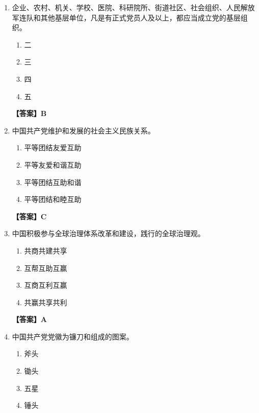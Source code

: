 \documentclass[UTF8,11pt,a4paper]{ctexart}
\begin{document}
\begin{enumerate}[label=\textbf{\arabic*.}, leftmargin=2.5em, itemsep=0.7em]
\begin{enumerate}[label=\Alph*., leftmargin=2em, itemsep=0.1em, topsep=0.15em]
\item 政治标准
\item 思想标准
\item 道德标准
\item 行为标准
\end{enumerate}
\textbf{【答案】A}
\item 企业、农村、机关、学校、医院、科研院所、街道社区、社会组织、人民解放军连队和其他基层单位，凡是有正式党员\allowbreak\underline{\hspace{4em}}人及以上，都应当成立党的基层组织。
\begin{enumerate}[label=\Alph*., leftmargin=2em, itemsep=0.1em, topsep=0.15em]
\item 二
\item 三
\item 四
\item 五
\end{enumerate}
\textbf{【答案】B}
\item 中国共产党维护和发展\allowbreak\underline{\hspace{4em}}的社会主义民族关系。
\begin{enumerate}[label=\Alph*., leftmargin=2em, itemsep=0.1em, topsep=0.15em]
\item 平等团结友爱互助
\item 平等友爱和谐互助
\item 平等团结互助和谐
\item 平等团结和睦互助
\end{enumerate}
\textbf{【答案】C}
\item 中国积极参与全球治理体系改革和建设，践行\allowbreak\underline{\hspace{4em}}的全球治理观。
\begin{enumerate}[label=\Alph*., leftmargin=2em, itemsep=0.1em, topsep=0.15em]
\item 共商共建共享
\item 互帮互助互赢
\item 互商互利互赢
\item 共赢共享共利
\end{enumerate}
\textbf{【答案】A}
\item 中国共产党党徽为镰刀和\allowbreak\underline{\hspace{4em}}组成的图案。
\begin{enumerate}[label=\Alph*., leftmargin=2em, itemsep=0.1em, topsep=0.15em]
\item 斧头
\item 锄头
\item 五星
\item 锤头

\end{enumerate}
\end{enumerate}
\end{document}
